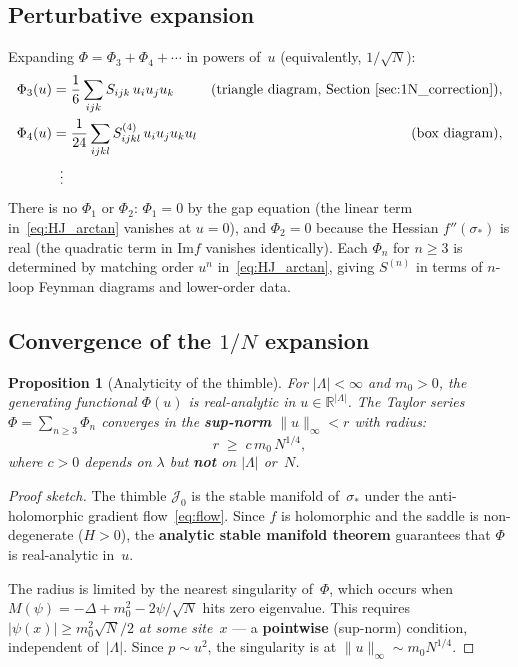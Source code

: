\documentclass[12pt]{article}
\newtheorem{proposition}[theorem]{Proposition}
\theoremstyle{definition}
\theoremstyle{remark}
\newcommand{\R}{\mathbb{R}}
\newcommand{\La}{\Lambda}
\newcommand{\im}{\mathrm{Im}}
\begin{document}
\subsection{Perturbative expansion}

Expanding $\Phi = \Phi_3 + \Phi_4 + \cdots$ in powers of~$u$
(equivalently, $1/\sqrt{N}$):
\begin{align}
  \Phi_3(u) &= \frac{1}{6}\sum_{ijk} S_{ijk}\,u_i u_j u_k
    &\text{(triangle diagram, Section~\ref{sec:1N_correction})}, \\
  \Phi_4(u) &= \frac{1}{24}\sum_{ijkl} S^{(4)}_{ijkl}\,
    u_i u_j u_k u_l
    &\text{(box diagram)}, \\
  &\;\;\vdots \nonumber
\end{align}
There is no $\Phi_1$ or $\Phi_2$: $\Phi_1 = 0$ by the gap equation
(the linear term in~\eqref{eq:HJ_arctan} vanishes at $u = 0$),
and $\Phi_2 = 0$ because the Hessian $f''(\sigma_*)$ is real (the
quadratic term in $\im f$ vanishes identically).
Each $\Phi_n$ for $n \ge 3$ is determined by matching order $u^n$
in~\eqref{eq:HJ_arctan}, giving $S^{(n)}$ in terms of $n$-loop
Feynman diagrams and lower-order data.

\subsection{Convergence of the $1/N$ expansion}

\begin{proposition}[Analyticity of the thimble]
For $|\La| < \infty$ and $m_0 > 0$, the generating functional
$\Phi(u)$ is real-analytic in $u \in \R^{|\La|}$.
The Taylor series $\Phi = \sum_{n \ge 3} \Phi_n$ converges
in the \textbf{sup-norm} $\|u\|_\infty < r$ with radius:
\begin{equation}\label{eq:radius}
  r \;\ge\; c\,m_0\,N^{1/4},
\end{equation}
where $c > 0$ depends on $\lambda$ but \textbf{not} on $|\La|$
or~$N$.
\end{proposition}

\begin{proof}[Proof sketch]
The thimble $\mathcal{J}_0$ is the stable manifold of~$\sigma_*$
under the anti-holomorphic gradient flow~\eqref{eq:flow}. Since
$f$ is holomorphic and the saddle is non-degenerate ($H > 0$),
the \textbf{analytic stable manifold theorem} guarantees that
$\Phi$ is real-analytic in~$u$.

The radius is limited by the nearest singularity of~$\Phi$,
which occurs when $M(\psi) = -\Delta + m_0^2 - 2\psi/\sqrt{N}$ hits
zero eigenvalue. This requires $|\psi(x)| \ge m_0^2\sqrt{N}/2$
\emph{at some site}~$x$ --- a \textbf{pointwise} (sup-norm)
condition, independent of~$|\La|$. Since $p \sim u^2$, the
singularity is at $\|u\|_\infty \sim m_0 N^{1/4}$.
\end{proof}
\end{document}
